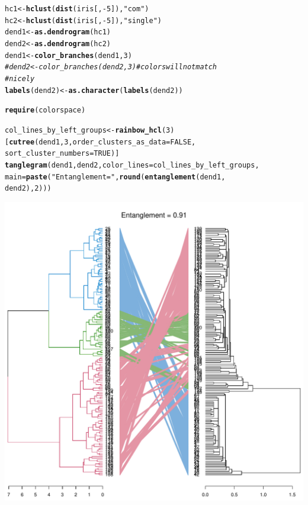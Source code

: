 \documentclass[shortnames,nojss,article]{jss}\usepackage[]{graphicx}\usepackage[]{color}
\makeatletter
\def\maxwidth{ %
  \ifdim\Gin@nat@width>\linewidth
    \linewidth
  \else
    \Gin@nat@width
  \fi
}
\newcommand{\hlnum}[1]{\textcolor[rgb]{0.686,0.059,0.569}{#1}}%
\newcommand{\hlstr}[1]{\textcolor[rgb]{0.192,0.494,0.8}{#1}}%
\newcommand{\hlcom}[1]{\textcolor[rgb]{0.678,0.584,0.686}{\textit{#1}}}%
\newcommand{\hlopt}[1]{\textcolor[rgb]{0,0,0}{#1}}%
\newcommand{\hlstd}[1]{\textcolor[rgb]{0.345,0.345,0.345}{#1}}%
\newcommand{\hlkwb}[1]{\textcolor[rgb]{0.69,0.353,0.396}{#1}}%
\newcommand{\hlkwc}[1]{\textcolor[rgb]{0.333,0.667,0.333}{#1}}%
\newcommand{\hlkwd}[1]{\textcolor[rgb]{0.737,0.353,0.396}{\textbf{#1}}}%
\newenvironment{kframe}{%
 \def\at@end@of@kframe{}%
 \ifinner\ifhmode%
  \def\at@end@of@kframe{\end{minipage}}%
  \begin{minipage}{\columnwidth}%
 \fi\fi%
 \def\FrameCommand##1{\hskip\@totalleftmargin \hskip-\fboxsep
 \colorbox{shadecolor}{##1}\hskip-\fboxsep
     \hskip-\linewidth \hskip-\@totalleftmargin \hskip\columnwidth}%
 \MakeFramed {\advance\hsize-\width
   \@totalleftmargin\z@ \linewidth\hsize
   \@setminipage}}%
 {\par\unskip\endMakeFramed%
 \at@end@of@kframe}
\newenvironment{knitrout}{}{} %
\makeatother
\begin{document}
\begin{knitrout}
\color{fgcolor}\begin{kframe}
\begin{alltt}
\hlstd{hc1} \hlkwb{<-} \hlkwd{hclust}\hlstd{(}\hlkwd{dist}\hlstd{(iris[,} \hlopt{-}\hlnum{5}\hlstd{]),} \hlstr{"com"}\hlstd{)}
\hlstd{hc2} \hlkwb{<-} \hlkwd{hclust}\hlstd{(}\hlkwd{dist}\hlstd{(iris[,} \hlopt{-}\hlnum{5}\hlstd{]),} \hlstr{"single"}\hlstd{)}
\hlstd{dend1} \hlkwb{<-} \hlkwd{as.dendrogram}\hlstd{(hc1)}
\hlstd{dend2} \hlkwb{<-} \hlkwd{as.dendrogram}\hlstd{(hc2)}
\hlstd{dend1} \hlkwb{<-} \hlkwd{color_branches}\hlstd{(dend1,} \hlnum{3}\hlstd{)}
\hlcom{# dend2 <- color_branches(dend2, 3) # colors will not match}
\hlcom{# nicely}
\hlkwd{labels}\hlstd{(dend2)} \hlkwb{<-} \hlkwd{as.character}\hlstd{(}\hlkwd{labels}\hlstd{(dend2)}\hlstd{)}

\hlkwd{require}\hlstd{(colorspace}\hlstd{)}

\hlstd{col_lines_by_left_groups} \hlkwb{<-} \hlkwd{rainbow_hcl}\hlstd{(}\hlnum{3}\hlstd{)[}\hlkwd{cutree}\hlstd{(dend1,} \hlnum{3}\hlstd{,} \hlkwc{order_clusters_as_data} \hlstd{=} \hlnum{FALSE}\hlstd{,}
    \hlkwc{sort_cluster_numbers} \hlstd{=} \hlnum{TRUE}\hlstd{)]}
\hlkwd{tanglegram}\hlstd{(dend1, dend2,} \hlkwc{color_lines} \hlstd{= col_lines_by_left_groups,}
    \hlkwc{main} \hlstd{=} \hlkwd{paste}\hlstd{(}\hlstr{"Entanglement ="}\hlstd{,} \hlkwd{round}\hlstd{(}\hlkwd{entanglement}\hlstd{(dend1,}
        \hlstd{dend2),} \hlnum{2}\hlstd{)))}
\end{alltt}
\end{kframe}

{\centering \includegraphics[width=\maxwidth]{figure/unnamed-chunk-32} 

}



\end{knitrout}
\end{document}

